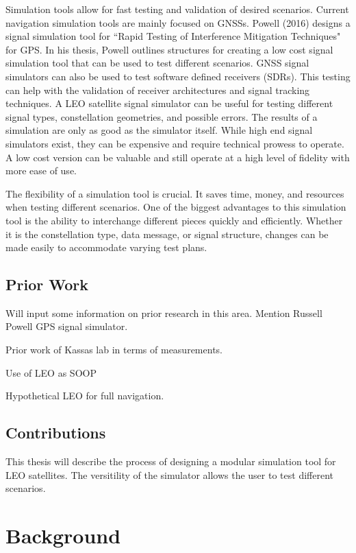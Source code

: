 \documentclass[12pt]{report}
\begin{document}
Simulation tools allow for fast testing and validation of desired scenarios. Current navigation simulation tools are mainly focused on GNSSs. Powell (2016) designs a signal simulation tool for ``Rapid Testing of Interference Mitigation Techniques" for GPS. In his thesis, Powell outlines structures for creating a low cost signal simulation tool that can be used to test different scenarios. GNSS signal simulators can also be used to test software defined receivers (SDRs). This testing can help with the validation of receiver architectures and signal tracking techniques. A LEO satellite signal simulator can be useful for testing different signal types, constellation geometries, and possible errors. The results of a simulation are only as good as the simulator itself. While high end signal simulators exist, they can be expensive and require technical prowess to operate. A low cost version can be valuable and still operate at a high level of fidelity with more ease of use. 

The flexibility of a simulation tool is crucial. It saves time, money, and resources when testing different scenarios. One of the biggest advantages to this simulation tool is the ability to interchange different pieces quickly and efficiently. Whether it is the constellation type, data message, or signal structure, changes can be made easily to accommodate varying test plans. 

\section { Prior Work }
Will input some information on prior research in this area. Mention Russell Powell GPS signal simulator.

Prior work of Kassas lab in terms of measurements.

Use of LEO as SOOP

Hypothetical LEO for full navigation.

\section { Contributions}
This thesis will describe the process of designing a modular simulation tool for LEO satellites. The versitility of the simulator allows the user to test different scenarios. 

\chapter{Background}
\end{document}
